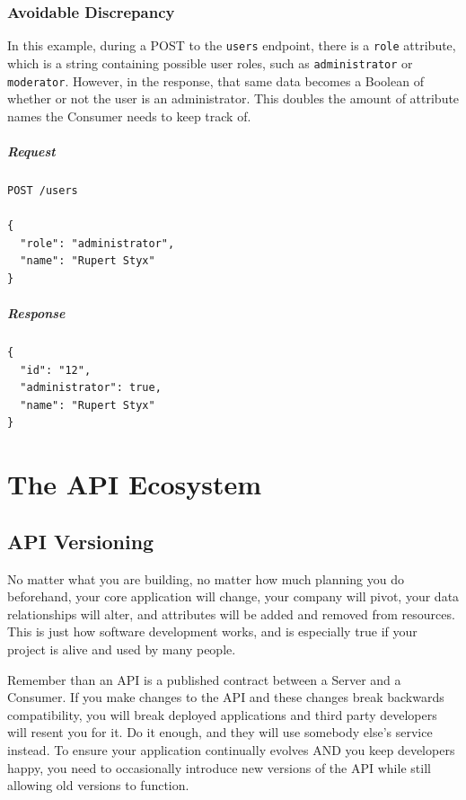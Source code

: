 \documentclass{book}
\begin{document}
\subsection{Avoidable Discrepancy}

In this example, during a POST to the \texttt{users} endpoint, there is a \texttt{role} attribute, which is a string containing possible user roles, such as \texttt{administrator} or \texttt{moderator}. However, in the response, that same data becomes a Boolean of whether or not the user is an administrator. This doubles the amount of attribute names the Consumer needs to keep track of.

\paragraph{\textbf{Request}}

\begin{verbatim}
POST /users

{
  "role": "administrator",
  "name": "Rupert Styx"
}
\end{verbatim}

\paragraph{\textbf{Response}}

\begin{verbatim}
{
  "id": "12",
  "administrator": true,
  "name": "Rupert Styx"
}
\end{verbatim}


\chapter{The API Ecosystem}

\section{API Versioning}

No matter what you are building, no matter how much planning you do beforehand, your core application will change, your company will pivot, your data relationships will alter, and attributes will be added and removed from resources. This is just how software development works, and is especially true if your project is alive and used by many people.

Remember than an API is a published contract between a Server and a Consumer. If you make changes to the API and these changes break backwards compatibility, you will break deployed applications and third party developers will resent you for it. Do it enough, and they will use somebody else's service instead. To ensure your application continually evolves AND you keep developers happy, you need to occasionally introduce new versions of the API while still allowing old versions to function.
\end{document}
